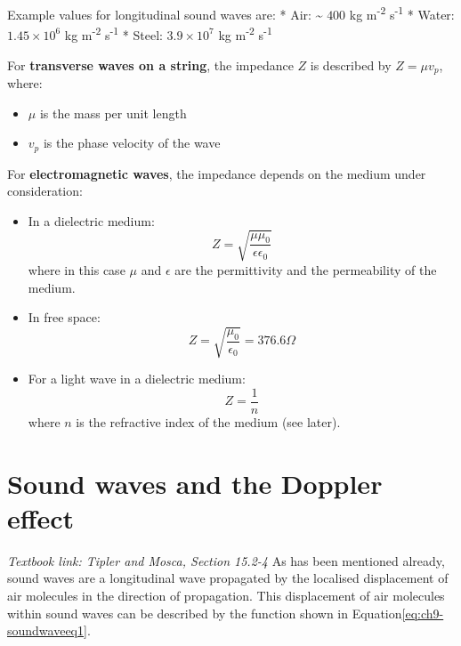 \documentclass[
]{book}
\providecommand{\tightlist}{%
  \setlength{\itemsep}{0pt}\setlength{\parskip}{0pt}}
\begin{document}
Example values for longitudinal sound waves are:
* Air: \textasciitilde{} \(400\) kg m\textsuperscript{-2} s\textsuperscript{-1}
* Water: \(1.45 \times 10^6\) kg m\textsuperscript{-2} s\textsuperscript{-1}
* Steel: \(3.9 \times 10^7\) kg m\textsuperscript{-2} s\textsuperscript{-1}

For \textbf{transverse waves on a string}, the impedance \(Z\) is described by \(Z = \mu v_p\), where:

\begin{itemize}
\tightlist
\item
  \(\mu\) is the mass per unit length
\item
  \(v_p\) is the phase velocity of the wave
\end{itemize}

For \textbf{electromagnetic waves}, the impedance depends on the medium under consideration:

\begin{itemize}
\item
  In a dielectric medium:
  \begin{equation}
  Z = \sqrt{\frac{\mu \mu_0}{\epsilon \epsilon_0}}
  \end{equation}
  where in this case \(\mu\) and \(\epsilon\) are the permittivity and the permeability of the medium.
\item
  In free space:
  \begin{equation}
  Z = \sqrt{\frac{ \mu_0}{ \epsilon_0}} = 376.6 \Omega
  \end{equation}
\item
  For a light wave in a dielectric medium:
  \begin{equation}
  Z = \frac{1}{n}
  \end{equation}
  where \(n\) is the refractive index of the medium (see later).
\end{itemize}

\hypertarget{sec:ch9-sounddoppler}{%
\chapter{Sound waves and the Doppler effect}\label{sec:ch9-sounddoppler}}

\emph{Textbook link: Tipler and Mosca, Section 15.2-4}
As has been mentioned already, sound waves are a longitudinal wave propagated by the localised displacement of air molecules in the direction of propagation. This displacement of air molecules within sound waves can be described by the function shown in Equation\eqref{eq:ch9-soundwaveeq1}.
\end{document}

